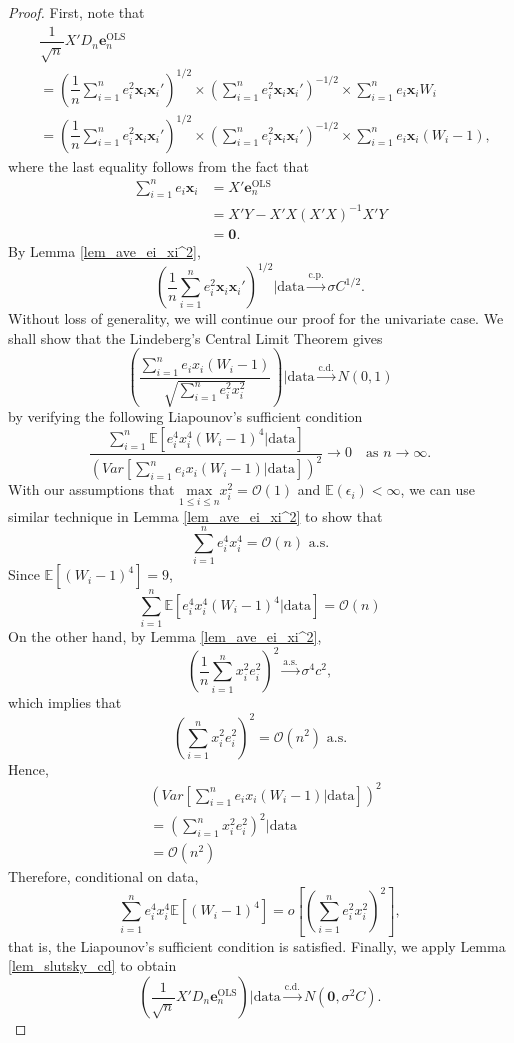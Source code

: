 \documentclass[12pt]{article}
\newcommand{\EX}{\mathbb{E}} %
\newcommand{\eLS}{\bm{e}_n^{\text{OLS}}} %
\newcommand{\sumin}{\sum_{i=1}^n} %
\newcommand{\dn}{\dfrac{1}{n}} %
\newcommand{\dqn}{\dfrac{1}{\sqrt{n}}} %
\newcommand{\CONV}[1]{\stackrel{\text{#1}}{\longrightarrow}} %
\newcommand{\x}{\bm{x}_i} %
\begin{document}
\begin{proof}
	First, note that
	\begin{align*}
	&\dqn X' D_n \eLS \\
	&= \left( \dn \sumin e_i^2 \x \x' \right)^{1/2}
		\times \left( \sumin e_i^2 \x \x' \right)^{-1/2}
		\times \sumin e_i \x W_i \\ 
	&= \left( \dn \sumin e_i^2 \x \x' \right)^{1/2}
		\times \left( \sumin e_i^2 \x \x' \right)^{-1/2}
		\times \sumin e_i \x (W_i - 1), 
	\end{align*}
	where the last equality follows from the fact that
	\begin{align*}
	\sumin e_i \x
	&= X' \eLS \\
	&= X'Y - X'X (X'X)^{-1} X'Y \\
	&= \bm{0}.
	\end{align*}
	By Lemma \ref{lem_ave_ei_xi^2}, 
	$$
	\left( \dn \sumin e_i^2 \x \x' \right)^{1/2}
	\bigg| \text{data}
	\CONV{c.p.} 
	\sigma C^{1/2}.
	$$
	Without loss of generality, we will continue our proof for the univariate case. We shall show that the Lindeberg's Central Limit Theorem gives 
	$$
	\left(
		\dfrac{ \sumin e_i x_i (W_i - 1) }
			  { \sqrt{\sumin e_i^2 x_i^2} }
	\right) \bigg| \text{data}
	\CONV{c.d.} N(0, 1)
	$$
	by verifying the following Liapounov's sufficient condition
	$$
	\dfrac{ \sumin \EX 
					\left[ 
						e_i^4 x_i^4 
						(W_i - 1)^4 
						| \text{data}
					\right] 
		  }
		  { \left( Var 
		  			\left[
			  			\sumin e_i x_i (W_i - 1)
			  			| \text{data}
			  		\right] 
			\right)^2 
		  }
	\to 0 
	\quad \text{as} \,\,
	n \to \infty.
	$$
	With our assumptions that $\underset{1 \leq i \leq n}{\text{max}} x_i^2 = \mathcal{O} (1)$ and   
	$\EX (\epsilon_i) < \infty$, we can use similar technique in Lemma \ref{lem_ave_ei_xi^2} to show that 
	$$
	\sumin e_i^4 x_i^4 = \mathcal{O} (n) \,\, \text{a.s.}
	$$
	Since $\EX \left[ (W_i - 1)^4 \right] = 9$, 
	$$
	\sumin \EX 
				\left[ 
					e_i^4 x_i^4 
					(W_i - 1)^4 
					| \text{data}
				\right]
			= \mathcal{O} (n)
	$$
	On the other hand, by Lemma \ref{lem_ave_ei_xi^2}, 
	$$
	\left( \dn \sumin x_i^2 e_i^2 \right)^2
	\CONV{a.s.} 
	\sigma^4 c^2,
	$$
	which implies that
	$$
	\left( \sumin x_i^2 e_i^2 \right)^2 
	= \mathcal{O} (n^2)
	\,\, \text{a.s.}
	$$
	Hence, 
	\begin{align*}
	&\left( Var 
		\left[
			\sumin e_i x_i (W_i - 1)
			\bigg| \text{data}
		\right] 
	\right)^2 \\
	&= \left( 
			\sumin x_i^2 e_i^2 
		\right)^2 
		\bigg| \text{data} \\
	&= \mathcal{O} (n^2)
	\end{align*}
	Therefore, conditional on data, 
	$$
	\sumin e_i^4 x_i^4 \EX \left[ (W_i - 1)^4 \right]
	= o \left[ \left(
				\sumin e_i^2 x_i^2 
				\right)^2 
		\right],
	$$ 
	that is, the Liapounov's sufficient condition is satisfied. Finally, we apply Lemma \ref{lem_slutsky_cd} to obtain
	$$
	\left( 
		\dqn X' D_n \eLS 
	\right) \bigg| \text{data}
	\CONV{c.d.} 
	N \left( \bm{0}, \sigma^2 C \right).
	$$
\end{proof}
\end{document}
